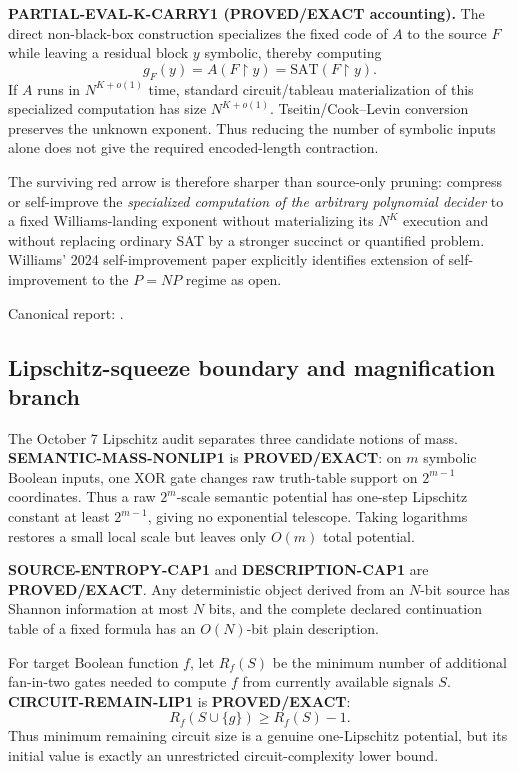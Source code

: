 \documentclass[11pt]{article}
\newcommand{\statusproved}{\textcolor{proved}{\textbf{PROVED/EXACT}}}
\theoremstyle{plain}
\theoremstyle{definition}
\theoremstyle{remark}
\begin{document}
\textbf{PARTIAL-EVAL-K-CARRY1 (PROVED/EXACT accounting).}
The direct non-black-box construction specializes the fixed code of \(A\) to
the source \(F\) while leaving a residual block \(y\) symbolic, thereby
computing
\[
g_F(y)=A(F\upharpoonright y)=\mathrm{SAT}(F\upharpoonright y).
\]
If \(A\) runs in \(N^{K+o(1)}\) time, standard circuit/tableau materialization
of this specialized computation has size \(N^{K+o(1)}\).  Tseitin/Cook--Levin
conversion preserves the unknown exponent.  Thus reducing the number of
symbolic inputs alone does not give the required encoded-length contraction.

The surviving red arrow is therefore sharper than source-only pruning:
compress or self-improve the \emph{specialized computation of the arbitrary
polynomial decider} to a fixed Williams-landing exponent without materializing
its \(N^K\) execution and without replacing ordinary SAT by a stronger succinct
or quantified problem.  Williams' 2024 self-improvement paper explicitly
identifies extension of self-improvement to the \(P=NP\) regime as open.

Canonical report:
.



\subsection{Lipschitz-squeeze boundary and magnification branch}

The October 7 Lipschitz audit separates three candidate notions of
mass. \textbf{SEMANTIC-MASS-NONLIP1} is \statusproved: on \(m\)
symbolic Boolean inputs, one XOR gate changes raw truth-table support on
\(2^{m-1}\) coordinates. Thus a raw \(2^m\)-scale semantic potential has
one-step Lipschitz constant at least \(2^{m-1}\), giving no exponential
telescope. Taking logarithms restores a small local scale but leaves only
\(O(m)\) total potential.

\textbf{SOURCE-ENTROPY-CAP1} and \textbf{DESCRIPTION-CAP1} are
\statusproved. Any deterministic object derived from an \(N\)-bit source
has Shannon information at most \(N\) bits, and the complete declared
continuation table of a fixed formula has an \(O(N)\)-bit plain description.

For target Boolean function \(f\), let \(R_f(S)\) be the minimum number of
additional fan-in-two gates needed to compute \(f\) from currently available
signals \(S\). \textbf{CIRCUIT-REMAIN-LIP1} is \statusproved:
\[
R_f(S\cup\{g\})\ge R_f(S)-1.
\]
Thus minimum remaining circuit size is a genuine one-Lipschitz potential,
but its initial value is exactly an unrestricted circuit-complexity lower
bound.
\end{document}

